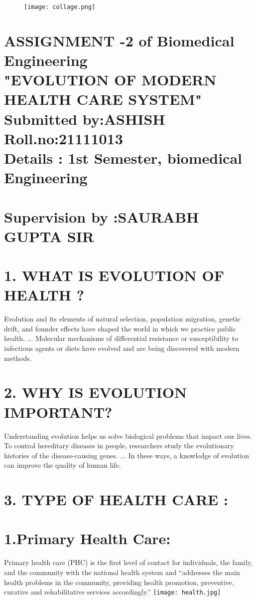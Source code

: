 \documentclass[12pt]{article}
\begin{document}
\begin{figure}
\centering
\texttt{[image: collage.png]}

\end{figure}

\section*{ASSIGNMENT -2 of Biomedical Engineering\\"EVOLUTION OF MODERN HEALTH CARE SYSTEM"\\Submitted by:ASHISH\\Roll.no:21111013\\Details : 1st Semester, biomedical Engineering\\\\Supervision by :SAURABH GUPTA SIR}

\clearpage
\section*{1. WHAT IS EVOLUTION OF HEALTH ?}
Evolution and its elements of natural selection, population migration, genetic drift, and founder effects have shaped the world in which we practice public health. ... Molecular mechanisms of differential resistance or susceptibility to infectious agents or diets have evolved and are being discovered with modern methods.

\section*{2. WHY IS EVOLUTION IMPORTANT?}
Understanding evolution helps us solve biological problems that impact our lives. To control hereditary diseases in people, researchers study the evolutionary histories of the disease-causing genes. ... In these ways, a knowledge of evolution can improve the quality of human life.
\section*{3. TYPE OF HEALTH CARE :}
\section*{1.Primary Health Care:}
Primary health care (PHC) is the first level of contact for individuals, the family, and the community with the national health system and “addresses the main health problems in the community, providing health promotion, preventive, curative and rehabilitative services accordingly.”
\centering
\texttt{[image: health.jpg]}
\end{document}
